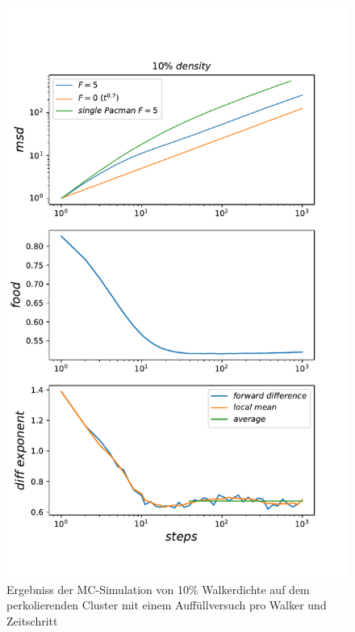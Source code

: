 \documentclass[a4paper, 12pt]{report}
\begin{document}
\begin{figure}[H]
	\centering
	\includegraphics[scale=0.75]{10percent_new_food1.pdf}
	\caption{Ergebniss der MC-Simulation von 10\% Walkerdichte auf dem perkolierenden Cluster mit einem Auffüllversuch pro Walker und Zeitschritt}
\end{figure}

\clearpage
\end{document}
